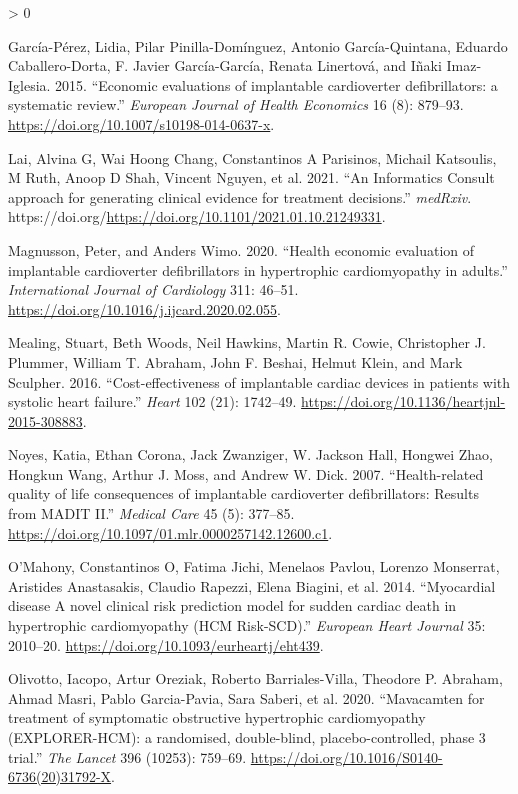 \documentclass[
]{article}
\newlength{\cslhangindent}
\newenvironment{CSLReferences}[2] %
 {%
  \setlength{\parindent}{0pt}
  \ifodd #1 \everypar{\setlength{\hangindent}{\cslhangindent}}\ignorespaces\fi
  \ifnum #2 > 0
  \setlength{\parskip}{#2\baselineskip}
  \fi
 }%
 {}
\begin{document}
\begin{CSLReferences}{1}{0}
\leavevmode\hypertarget{ref-Garcia-Perez2015}{}%
García-Pérez, Lidia, Pilar Pinilla-Domínguez, Antonio García-Quintana, Eduardo Caballero-Dorta, F. Javier García-García, Renata Linertová, and Iñaki Imaz-Iglesia. 2015. {``{Economic evaluations of implantable cardioverter defibrillators: a systematic review}.''} \emph{European Journal of Health Economics} 16 (8): 879--93. \url{https://doi.org/10.1007/s10198-014-0637-x}.

\leavevmode\hypertarget{ref-Lai2021}{}%
Lai, Alvina G, Wai Hoong Chang, Constantinos A Parisinos, Michail Katsoulis, M Ruth, Anoop D Shah, Vincent Nguyen, et al. 2021. {``{An Informatics Consult approach for generating clinical evidence for treatment decisions}.''} \emph{medRxiv}. https://doi.org/\url{https://doi.org/10.1101/2021.01.10.21249331}.

\leavevmode\hypertarget{ref-Magnusson2020}{}%
Magnusson, Peter, and Anders Wimo. 2020. {``{Health economic evaluation of implantable cardioverter defibrillators in hypertrophic cardiomyopathy in adults}.''} \emph{International Journal of Cardiology} 311: 46--51. \url{https://doi.org/10.1016/j.ijcard.2020.02.055}.

\leavevmode\hypertarget{ref-Mealing2016}{}%
Mealing, Stuart, Beth Woods, Neil Hawkins, Martin R. Cowie, Christopher J. Plummer, William T. Abraham, John F. Beshai, Helmut Klein, and Mark Sculpher. 2016. {``{Cost-effectiveness of implantable cardiac devices in patients with systolic heart failure}.''} \emph{Heart} 102 (21): 1742--49. \url{https://doi.org/10.1136/heartjnl-2015-308883}.

\leavevmode\hypertarget{ref-Noyes2007}{}%
Noyes, Katia, Ethan Corona, Jack Zwanziger, W. Jackson Hall, Hongwei Zhao, Hongkun Wang, Arthur J. Moss, and Andrew W. Dick. 2007. {``{Health-related quality of life consequences of implantable cardioverter defibrillators: Results from MADIT II}.''} \emph{Medical Care} 45 (5): 377--85. \url{https://doi.org/10.1097/01.mlr.0000257142.12600.c1}.

\leavevmode\hypertarget{ref-OMahony2014}{}%
O'Mahony, Constantinos O, Fatima Jichi, Menelaos Pavlou, Lorenzo Monserrat, Aristides Anastasakis, Claudio Rapezzi, Elena Biagini, et al. 2014. {``{Myocardial disease A novel clinical risk prediction model for sudden cardiac death in hypertrophic cardiomyopathy (HCM Risk-SCD)}.''} \emph{European Heart Journal} 35: 2010--20. \url{https://doi.org/10.1093/eurheartj/eht439}.

\leavevmode\hypertarget{ref-Olivotto2020}{}%
Olivotto, Iacopo, Artur Oreziak, Roberto Barriales-Villa, Theodore P. Abraham, Ahmad Masri, Pablo Garcia-Pavia, Sara Saberi, et al. 2020. {``{Mavacamten for treatment of symptomatic obstructive hypertrophic cardiomyopathy (EXPLORER-HCM): a randomised, double-blind, placebo-controlled, phase 3 trial}.''} \emph{The Lancet} 396 (10253): 759--69. \url{https://doi.org/10.1016/S0140-6736(20)31792-X}.


\end{CSLReferences}
\end{document}
